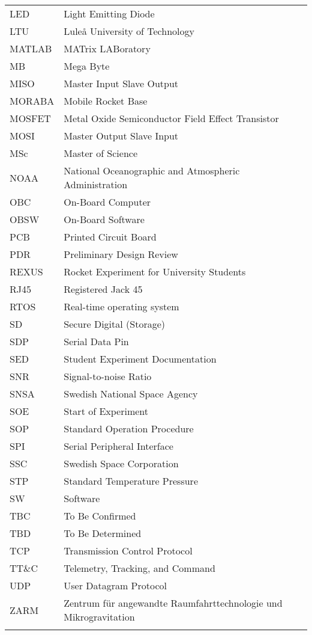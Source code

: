 \begin{longtable}{p{3cm} p{9cm}}
             LED         & Light Emitting Diode\\
             LTU         & Luleå University of Technology \\
             MATLAB      & MATrix LABoratory\\
             MB          & Mega Byte\\
             MISO        & Master Input Slave Output\\
             MORABA      & Mobile Rocket Base \\
             MOSFET      & Metal Oxide Semiconductor Field Effect Transistor\\
             MOSI        & Master Output Slave Input\\
             MSc         & Master of Science \\
             NOAA        & National Oceanographic and Atmospheric Administration \\
             OBC         & On-Board Computer\\
             OBSW        & On-Board Software\\
             PCB         & Printed Circuit Board\\
             PDR         & Preliminary Design Review\\
             REXUS       & Rocket Experiment for University Students \\
             RJ45        & Registered Jack 45 \\
             RTOS        & Real-time operating system\\
             SD          & Secure Digital (Storage) \\
             SDP         & Serial Data Pin\\
             SED         & Student Experiment Documentation \\
             SNR         & Signal-to-noise Ratio\\
             SNSA        & Swedish National Space Agency \\
             SOE         & Start of Experiment\\
             SOP         & Standard Operation Procedure\\
             SPI         & Serial Peripheral Interface\\
             SSC         & Swedish Space Corporation \\
             STP         & Standard Temperature Pressure\\
             SW          & Software\\
             TBC         & To Be Confirmed\\
             TBD         & To Be Determined \\
             TCP         & Transmission Control Protocol\\
             TT$\&$C     & Telemetry, Tracking, and Command\\
             UDP         & User Datagram Protocol\\
             ZARM        & Zentrum f{\"u}r angewandte Raumfahrttechnologie und Mikrogravitation \\
         \label{tab:abbrevi}
     \end{longtable}
     \raggedbottom
